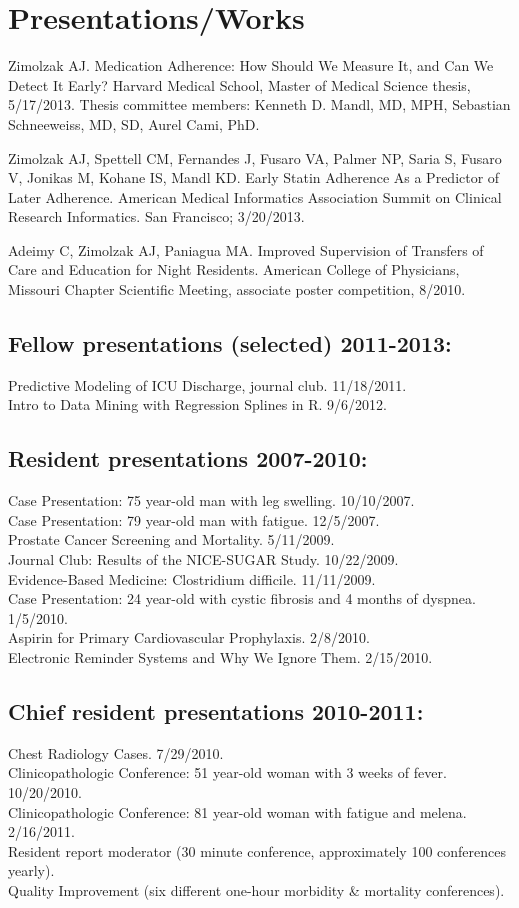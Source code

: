 \documentclass[11pt]{article}
\begin{document}
\section{Presentations/Works}
Zimolzak AJ. Medication Adherence: How Should We Measure It, and Can
We Detect It Early? Harvard Medical School, Master of Medical Science
thesis, 5/17/2013. Thesis committee members: Kenneth D. Mandl, MD,
MPH, Sebastian Schneeweiss, MD, SD, Aurel Cami, PhD.

Zimolzak AJ, Spettell CM, Fernandes J, Fusaro VA, Palmer NP, Saria S,
Fusaro V, Jonikas M, Kohane IS, Mandl KD. Early Statin Adherence As a
Predictor of Later Adherence. American Medical Informatics Association
Summit on Clinical Research Informatics. San Francisco; 3/20/2013.

Adeimy C, Zimolzak AJ, Paniagua MA. Improved Supervision of Transfers
of Care and Education for Night Residents. American College of
Physicians, Missouri Chapter Scientific Meeting, associate poster
competition, 8/2010.

\subsection{Fellow presentations (selected) 2011-2013:}
Predictive Modeling of ICU Discharge, journal club. 11/18/2011.\\
Intro to Data Mining with Regression Splines in R. 9/6/2012.

\subsection{Resident presentations 2007-2010:}
Case Presentation: 75 year-old man with leg swelling. 10/10/2007.\\
Case Presentation: 79 year-old man with fatigue. 12/5/2007.\\
Prostate Cancer Screening and Mortality. 5/11/2009.\\
Journal Club: Results of the NICE-SUGAR Study. 10/22/2009.\\
Evidence-Based Medicine: Clostridium difficile. 11/11/2009.\\
Case Presentation: 24 year-old with cystic fibrosis and 4 months of
dyspnea. 1/5/2010.\\
Aspirin for Primary Cardiovascular Prophylaxis. 2/8/2010.\\
Electronic Reminder Systems and Why We Ignore Them. 2/15/2010.

\subsection{Chief resident presentations 2010-2011:}
Chest Radiology Cases. 7/29/2010.\\
Clinicopathologic Conference: 51 year-old woman with 3 weeks of fever.
10/20/2010.\\
Clinicopathologic Conference: 81 year-old woman with fatigue and
melena. 2/16/2011.\\
Resident report moderator (30 minute conference, approximately 100
conferences yearly).\\
Quality Improvement (six different one-hour morbidity \& mortality
conferences).\\
\end{document}
